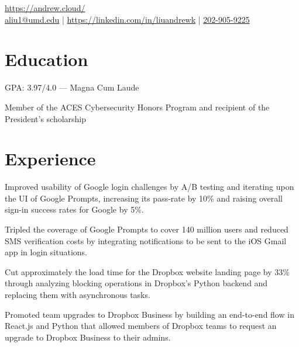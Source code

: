 \documentclass[]{template}
\begin{document}
\lastupdated

{
  \url{https://andrew.cloud/} \\
  \href{mailto:aliu1@umd.edu}{aliu1@umd.edu} |
  \href{https://linkedin.com/in/liuandrewk}{https://linkedin.com/in/liuandrewk} |
  \href{tel:2029059225}{202-905-9225}
}

\section{Education}
\begin{tightemize}
\item GPA: 3.97/4.0 --- Magna Cum Laude
\item Member of the ACES Cybersecurity Honors Program and recipient of the President's scholarship
\end{tightemize}
\sectionsep

\section{Experience}

\begin{tightemize}
\item Improved usability of Google login challenges by A/B testing and iterating upon the UI of Google Prompts, increasing its pass-rate by 10\% and raising overall sign-in success rates for Google by 5\%.
\item Tripled the coverage of Google Prompts to cover 140 million users and reduced SMS verification costs by integrating notifications to be sent to the iOS Gmail app in login situations.
\end{tightemize}
\sectionsep

\begin{tightemize}
\item Cut approximately the load time for the Dropbox website landing page by 33\% through analyzing blocking operations in Dropbox's Python backend and replacing them with asynchronous tasks.
\item Promoted team upgrades to Dropbox Business by building an end-to-end flow in React.js and Python that allowed members of Dropbox teams to request an upgrade to Dropbox Business to their admins.
\end{tightemize}
\sectionsep
\end{document}
